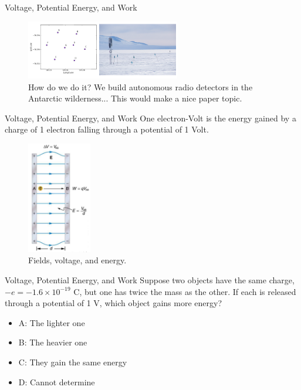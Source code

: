 \documentclass{beamer}
\begin{document}
\begin{frame}{Voltage, Potential Energy, and Work}
\begin{figure}
\centering
\includegraphics[width=0.6\textwidth]{figures/ARIANNA3.png}
\caption{\label{fig:arianna3} How do we do it?  We build autonomous radio detectors in the Antarctic wilderness... This would make a nice paper topic.}
\end{figure}
\end{frame}

\begin{frame}{Voltage, Potential Energy, and Work}
One electron-Volt is the energy gained by a charge of 1 electron falling through a potential of 1 Volt.
\begin{figure}
\centering
\includegraphics[width=0.25\textwidth]{figures/plates2.png}
\caption{\label{fig:plates2} Fields, voltage, and energy.}
\end{figure}
\end{frame}

\begin{frame}{Voltage, Potential Energy, and Work}
Suppose two objects have the same charge, $-e = -1.6\times 10^{-19}$ C, but one has twice the mass as the other.  If each is released through a potential of 1 V, which object gains more energy?
\begin{itemize}
\item A: The lighter one
\item B: The heavier one
\item C: They gain the same energy
\item D: Cannot determine
\end{itemize}
\end{frame}
\end{document}
